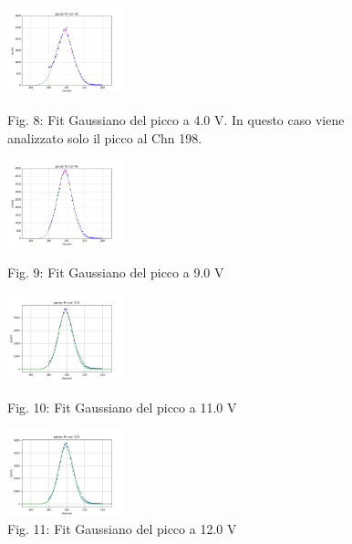 \documentclass[a4paper]{article}
\begin{document}
\begin{figure}[!h]
\includegraphics[width=0.3\textwidth]{Fit_Gaussiano_con_4V}
        \caption{Fig. 8: Fit Gaussiano del picco a 4.0 V. In questo caso viene analizzato solo il picco al Chn 198.}
        \label{fig:8}
\includegraphics[width=0.3\textwidth]{Fit_Gaussiano_con_9V}
        \caption{Fig. 9: Fit Gaussiano del picco a 9.0 V}
        \label{fig:9}

\includegraphics[width=0.3\textwidth]{Fit_Gaussiano_con_11V}
        \caption{Fig. 10: Fit Gaussiano del picco a 11.0 V}
        \label{fig:10}
\includegraphics[width=0.3\textwidth]{Fit_Gaussiano_con_12V}
        \caption{Fig. 11: Fit Gaussiano del picco a 12.0 V}
        \label{fig:11}        
\end{figure}
\newpage
\end{document}
